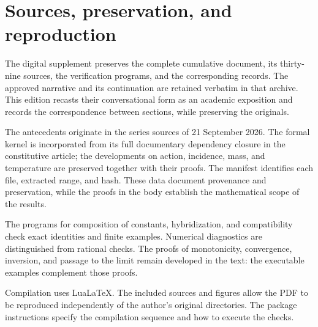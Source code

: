 \section{Sources, preservation, and reproduction}
The digital supplement preserves the complete cumulative document, its
thirty-nine sources, the verification programs, and the corresponding
records. The approved narrative and its continuation are retained
verbatim in that archive. This edition recasts their conversational
form as an academic exposition and records the correspondence between
sections, while preserving the originals.

The antecedents originate in the series sources of 21 September 2026.
The formal kernel is incorporated from its full documentary dependency
closure in the constitutive article; the developments on action,
incidence, mass, and temperature are preserved together with their
proofs. The manifest identifies each file, extracted range, and hash.
These data document provenance and preservation, while the proofs in
the body establish the mathematical scope of the results.

The programs for composition of constants, hybridization, and
compatibility check exact identities and finite examples. Numerical
diagnostics are distinguished from rational checks. The proofs of
monotonicity, convergence, inversion, and passage to the limit remain
developed in the text: the executable examples complement those proofs.

Compilation uses LuaLaTeX. The included sources and figures allow the
PDF to be reproduced independently of the author's original
directories. The package instructions specify the compilation sequence
and how to execute the checks.
